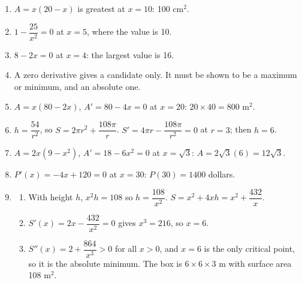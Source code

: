 \documentclass[11pt]{article}
\begin{document}
\newpage
\begin{solbox}
\begin{enumerate}[leftmargin=*,itemsep=4pt]
  \item $A=x(20-x)$ is greatest at $x=10$: 100 cm$^2$.
  \item $1-\dfrac{25}{x^2}=0$ at $x=5$, where the value is 10.
  \item $8-2x=0$ at $x=4$: the largest value is 16.
  \item A zero derivative gives a candidate only. It must be shown to be a maximum or minimum, and an absolute one.
  \item $A=x(80-2x)$, $A'=80-4x=0$ at $x=20$: $20\times40=800$ m$^2$.
  \item $h=\dfrac{54}{r^2}$, so $S=2\pi r^2+\dfrac{108\pi}{r}$. $S'=4\pi r-\dfrac{108\pi}{r^2}=0$ at $r=3$; then $h=6$.
  \item $A=2x\left(9-x^2\right)$, $A'=18-6x^2=0$ at $x=\sqrt3$: $A=2\sqrt3(6)=12\sqrt3$.
  \item $P'(x)=-4x+120=0$ at $x=30$: $P(30)=1400$ dollars.
  \item \begin{enumerate}[label=(\alph*),leftmargin=*,itemsep=3pt]
    \item With height $h$, $x^2h=108$ so $h=\dfrac{108}{x^2}$. $S=x^2+4xh=x^2+\dfrac{432}{x}$.
    \item $S'(x)=2x-\dfrac{432}{x^2}=0$ gives $x^3=216$, so $x=6$.
    \item $S''(x)=2+\dfrac{864}{x^3}>0$ for all $x>0$, and $x=6$ is the only critical point, so it is the absolute minimum. The box is $6\times6\times3$ m with surface area 108 m$^2$.
  \end{enumerate}
\end{enumerate}
\end{solbox}
\end{document}
